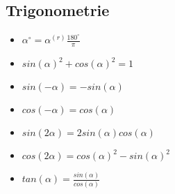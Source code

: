 \subsection{Trigonometrie}
\begin{itemize}
	\item $\alpha^\circ = \alpha^{(r)} \frac{180^\circ}{\pi}$
	\item $sin(\alpha)^2 + cos(\alpha)^2 = 1$
	\item $sin(-\alpha) = - sin(\alpha)$
	\item $cos(-\alpha) = cos(\alpha)$
	\item $sin(2\alpha) = 2 sin(\alpha) cos(\alpha)$
	\item $cos(2\alpha) = cos(\alpha)^2 - sin(\alpha)^2$
	\item $tan(\alpha) = \frac{sin(\alpha)}{cos(\alpha)}$
\end{itemize}
